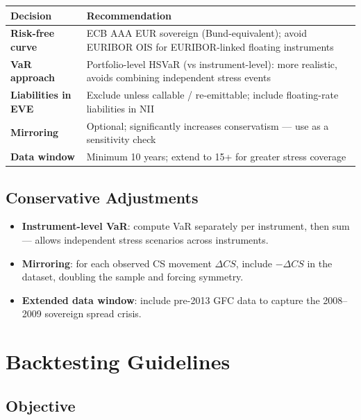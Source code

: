 \documentclass[11pt, a4paper]{article}
\begin{document}
\begin{center}
\begin{tabular}{>{\bfseries}p{4.5cm} p{9cm}}
    \toprule
    Decision & Recommendation \\
    \midrule
    Risk-free curve & ECB AAA EUR sovereign (Bund-equivalent); avoid EURIBOR OIS for EURIBOR-linked floating instruments \\
    VaR approach & Portfolio-level HSVaR (vs instrument-level): more realistic, avoids combining independent stress events \\
    Liabilities in EVE & Exclude unless callable / re-emittable; include floating-rate liabilities in NII \\
    Mirroring & Optional; significantly increases conservatism — use as a sensitivity check \\
    Data window & Minimum 10 years; extend to 15+ for greater stress coverage \\
    \bottomrule
\end{tabular}
\end{center}

\subsection{Conservative Adjustments}

\begin{itemize}[noitemsep]
    \item \textbf{Instrument-level VaR}: compute VaR separately per instrument, then sum — allows independent stress scenarios across instruments.
    \item \textbf{Mirroring}: for each observed CS movement $\Delta CS$, include $-\Delta CS$ in the dataset, doubling the sample and forcing symmetry.
    \item \textbf{Extended data window}: include pre-2013 GFC data to capture the 2008--2009 sovereign spread crisis.
\end{itemize}

\section{Backtesting Guidelines}

\subsection{Objective}
\end{document}
